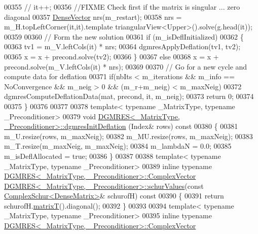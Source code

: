 \begin{DoxyCode}
00355 \textcolor{comment}{//   it++;}
00356   \textcolor{comment}{//FIXME  Check first if the matrix is singular ... zero diagonal}
00357   \hyperlink{group___core___module}{DenseVector} nrs(m\_restart); 
00358   nrs = m\_H.topLeftCorner(it,it).template triangularView<Upper>().solve(g.head(it)); 
00359   
00360   \textcolor{comment}{// Form the new solution}
00361   \textcolor{keywordflow}{if} (m\_isDeflInitialized)
00362   \{
00363     tv1 = m\_V.leftCols(it) * nrs; 
00364     dgmresApplyDeflation(tv1, tv2); 
00365     x = x + precond.solve(tv2);
00366   \}
00367   \textcolor{keywordflow}{else}
00368     x = x + precond.solve(m\_V.leftCols(it) * nrs); 
00369   
00370   \textcolor{comment}{// Go for a new cycle and compute data for deflation}
00371   \textcolor{keywordflow}{if}(nbIts < m\_iterations && m\_info == NoConvergence && m\_neig > 0 && (m\_r+m\_neig) < m\_maxNeig)
00372     dgmresComputeDeflationData(mat, precond, it, m\_neig); 
00373   \textcolor{keywordflow}{return} 0; 
00374   
00375 \}
00376 
00377 
00378 \textcolor{keyword}{template}< \textcolor{keyword}{typename} \_MatrixType, \textcolor{keyword}{typename} \_Preconditioner>
00379 \textcolor{keywordtype}{void} \hyperlink{class_eigen_1_1_d_g_m_r_e_s}{DGMRES<\_MatrixType, \_Preconditioner>::dgmresInitDeflation}
      (Index& rows)\textcolor{keyword}{ const}
00380 \textcolor{keyword}{}\{
00381   m\_U.resize(rows, m\_maxNeig);
00382   m\_MU.resize(rows, m\_maxNeig); 
00383   m\_T.resize(m\_maxNeig, m\_maxNeig);
00384   m\_lambdaN = 0.0; 
00385   m\_isDeflAllocated = \textcolor{keyword}{true}; 
00386 \}
00387 
00388 \textcolor{keyword}{template}< \textcolor{keyword}{typename} \_MatrixType, \textcolor{keyword}{typename} \_Preconditioner>
00389 \textcolor{keyword}{inline} \textcolor{keyword}{typename} \hyperlink{group___core___module_class_eigen_1_1_matrix}{DGMRES<\_MatrixType, \_Preconditioner>::ComplexVector}
       \hyperlink{class_eigen_1_1_d_g_m_r_e_s}{DGMRES<\_MatrixType, \_Preconditioner>::schurValues}(\textcolor{keyword}{const} 
      \hyperlink{group___eigenvalues___module_class_eigen_1_1_complex_schur}{ComplexSchur<DenseMatrix>}& schurofH)\textcolor{keyword}{ const}
00390 \textcolor{keyword}{}\{
00391   \textcolor{keywordflow}{return} schurofH.\hyperlink{group___eigenvalues___module_add3ab5ed83f7f2f06b79fa910a2d5684}{matrixT}().diagonal();
00392 \}
00393 
00394 \textcolor{keyword}{template}< \textcolor{keyword}{typename} \_MatrixType, \textcolor{keyword}{typename} \_Preconditioner>
00395 \textcolor{keyword}{inline} \textcolor{keyword}{typename} \hyperlink{group___core___module_class_eigen_1_1_matrix}{DGMRES<\_MatrixType, \_Preconditioner>::ComplexVector}

\end{DoxyCode}
